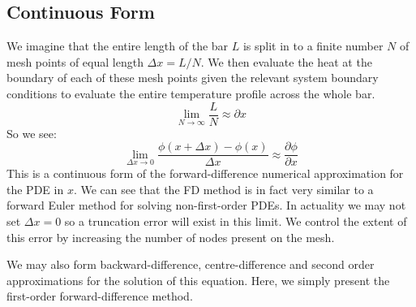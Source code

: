 \documentclass{article}[12pt]
\begin{document}
\subsection*{Continuous Form}
We imagine that the entire length of the bar $L$ is split in to a finite number $N$ of mesh points of equal length $\Delta x = L/N$. We then evaluate the heat at the boundary of each of these mesh points given the relevant system boundary conditions to evaluate the entire temperature profile across the whole bar.
\begin{equation}
  \lim_{N\rightarrow \infty}\frac{L}{N} \approx\partial x 
\end{equation}
So we see:
\begin{equation}\label{eq:continuous_forward}
\lim_{\Delta x \rightarrow 0 } \frac{\phi(x+\Delta x) - \phi(x)}{\Delta x} \approx \frac{\partial \phi}{\partial x}
\end{equation}
This is a continuous form of the forward-difference numerical approximation for the PDE in $x$. We can see that the FD method is in fact very similar to a forward Euler method for solving non-first-order PDEs. In actuality we may not set $\Delta x = 0$ so a truncation error will exist in this limit. We  control the extent of this error by increasing the number of nodes present on the mesh.\par
We may also form backward-difference, centre-difference and second order approximations for the solution of this equation. Here, we simply present the first-order forward-difference method.
\end{document}
